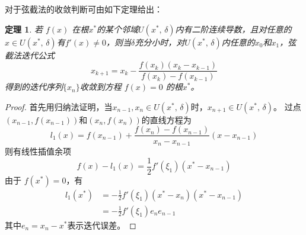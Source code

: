 \documentclass[11pt]{article}
\newtheorem{Theorem}{定理}
\begin{document}
对于弦截法的收敛判断可由如下定理给出：
\begin{Theorem}
    若 $f(x)$ 在根$x^*$的某个邻域$U(x^*,\, \delta)$内有二阶连续导数，且对任意的$x \in U(x^*,\, \delta)$有$f'(x) \neq 0$，则当$\delta$充分小时，对$U(x^*,\, \delta)$内任意的$x_0$和$x_1$，弦截法迭代公式
    \begin{equation}
        x_{k + 1} = x_k - \frac{f(x_k)(x_k - x_{k - 1})}{f(x_k) - f(x_{k - 1})} \label{1} \tag{1}
    \end{equation}
    得到的迭代序列$\{x_n\}$收敛到方程 $f(x) = 0$ 的根$x^*$。
\end{Theorem}
\begin{proof}
    首先用归纳法证明，当$x_{n - 1}, x_n \in U(x^*,\, \delta)$时，$x_{n + 1} \in U(x^*,\, \delta)$。
    过点$(x_{n - 1}, f(x_{n - 1}))$和$(x_{n}, f(x_{n}))$的直线方程为
    \begin{equation*}
        l_1(x) = f(x_{n - 1}) + \frac{f(x_n) - f(x_{n - 1})}{x_n - x_{n - 1}}(x - x_{n - 1})
    \end{equation*}
    则有线性插值余项
    \begin{equation*}
        f(x) - l_1(x) = \frac{1}{2}f'(\xi_1)(x^* - x_{n - 1})
    \end{equation*}
    由于 $f(x^*) = 0$，有
    \begin{align*}
        l_1(x^*) & = -\frac{1}{2} f'(\xi_1)(x^* - x_n)(x^* - x_{n - 1})  \\
                 & = -\frac{1}{2}f'(\xi_1)e_ne_{n - 1} \label{2} \tag{2}
    \end{align*}
    其中$e_n = x_n - x^*$表示迭代误差。


\end{proof}
\end{document}
